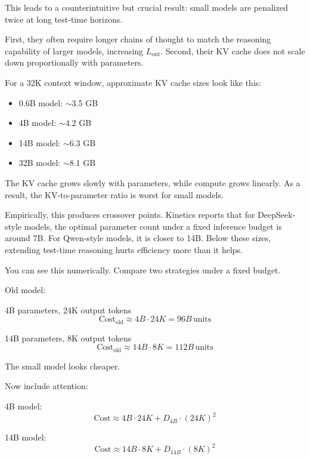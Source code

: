 \documentclass[12pt]{article}
\begin{document}
This leads to a counterintuitive but crucial result: small models are penalized twice at long test-time horizons.

First, they often require longer chains of thought to match the reasoning capability of larger models, increasing $L_\text{out}$. Second, their KV cache does not scale down proportionally with parameters.

For a 32K context window, approximate KV cache sizes look like this:

\begin{itemize}
\item 0.6B model: $\sim$3.5 GB
\item 4B model: $\sim$4.2 GB
\item 14B model: $\sim$6.3 GB
\item 32B model: $\sim$8.1 GB
\end{itemize}

The KV cache grows slowly with parameters, while compute grows linearly. As a result, the KV-to-parameter ratio is worst for small models.

Empirically, this produces crossover points. Kinetics reports that for DeepSeek-style models, the optimal parameter count under a fixed inference budget is around 7B. For Qwen-style models, it is closer to 14B. Below these sizes, extending test-time reasoning hurts efficiency more than it helps.

You can see this numerically. Compare two strategies under a fixed budget.

Old model:

4B parameters, 24K output tokens
\begin{equation}
\text{Cost}_\text{old} \approx 4B \cdot 24K = 96B \, \text{units}
\end{equation}

14B parameters, 8K output tokens
\begin{equation}
\text{Cost}_\text{old} \approx 14B \cdot 8K = 112B \, \text{units}
\end{equation}

The small model looks cheaper.

Now include attention:

4B model:
\begin{equation}
\text{Cost} \approx 4B \cdot 24K + D_{4B} \cdot (24K)^2
\end{equation}

14B model:
\begin{equation}
\text{Cost} \approx 14B \cdot 8K + D_{14B} \cdot (8K)^2
\end{equation}
\end{document}
